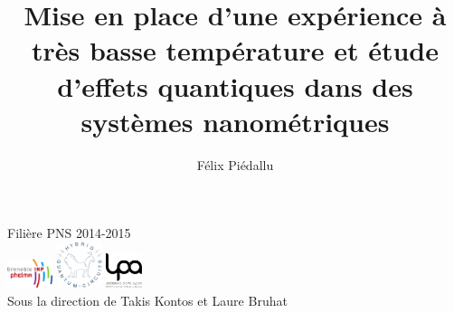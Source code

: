 \documentclass[8pt,a9paper]{beamer} \usepackage[utf8]{inputenc} \usepackage[francais]{babel} \usepackage[T1]{fontenc}
\title{Mise en place d’une expérience à très basse température et étude d’effets quantiques dans des systèmes nanométriques}
\author{Félix Piédallu}
\date{}
\begin{document}
\begin{frame}
    \maketitle
    \vspace*{-1.5cm}
    \begin{center}
    Filière PNS 2014-2015\\[1.2cm]
    \includegraphics[width=50px]{Images/logo_phelma}\qquad
    \includegraphics[width=50px]{Images/logo_HQC}\qquad
    \hspace*{10px}
    \includegraphics[width=40px]{Images/logo_lpa}\qquad
    \\[0.2cm]
    Sous la direction de Takis Kontos et Laure Bruhat
    \end{center}
\end{frame}

\begin{frame}
\tableofcontents
\end{frame}
\end{document}

